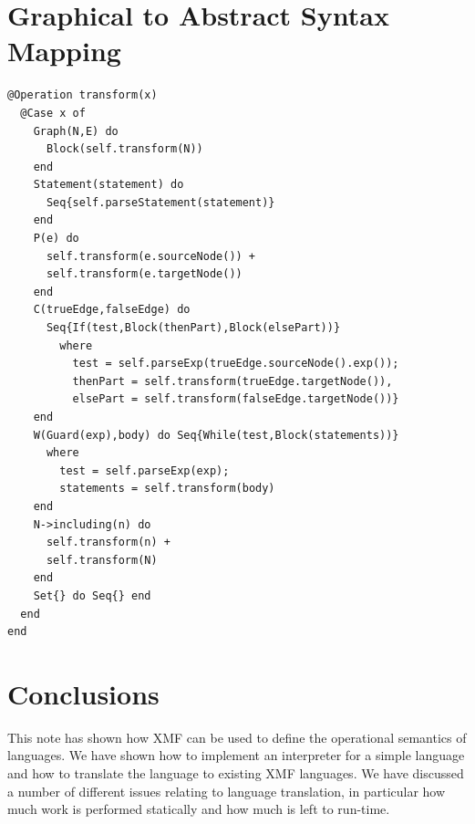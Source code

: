 \documentclass{article}
\begin{document}
\section{Graphical to Abstract Syntax Mapping}

\begin{verbatim}
@Operation transform(x)
  @Case x of
    Graph(N,E) do 
      Block(self.transform(N))
    end
    Statement(statement) do
      Seq{self.parseStatement(statement)}
    end
    P(e) do
      self.transform(e.sourceNode()) + 
      self.transform(e.targetNode())
    end
    C(trueEdge,falseEdge) do
      Seq{If(test,Block(thenPart),Block(elsePart))}
        where 
          test = self.parseExp(trueEdge.sourceNode().exp());
          thenPart = self.transform(trueEdge.targetNode()),
          elsePart = self.transform(falseEdge.targetNode())}
    end
    W(Guard(exp),body) do Seq{While(test,Block(statements))}
      where
        test = self.parseExp(exp);
        statements = self.transform(body)
    end
    N->including(n) do
      self.transform(n) + 
      self.transform(N)
    end
    Set{} do Seq{} end
  end
end
\end{verbatim}

\section{Conclusions}

This note has shown how XMF can be used to define the operational semantics of languages. We
have shown how to implement an interpreter for a simple language and how to translate the
language to existing XMF languages. We have discussed a number of different issues relating to
language translation, in particular how much work is performed statically and how much is left
to run-time.
\end{document}
